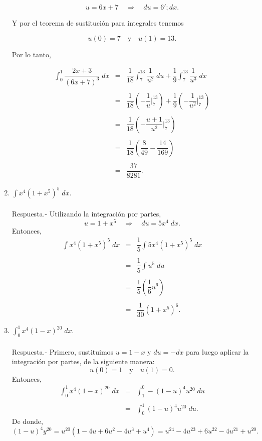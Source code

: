 \begin{enumerate}[\bfseries 1.]
	$$u=6x+7\quad \Rightarrow \quad du=6'; dx.$$

	Y por el teorema de sustitución para integrales tenemos

	$$u(0)=7\quad \mbox{y} \quad u(1)=13.$$

	Por lo tanto,

	$$
	\begin{array}{rcl}
	    \displaystyle\int_0^1 \dfrac{2x+3}{(6x+7)^3}\; dx &=& \dfrac{1}{18}\displaystyle\int_7^{13} \dfrac{1}{u^2}\; du  + \dfrac{1}{9}\int_7^{13} \dfrac{1}{u^3}\; dx\\\\
							      &=& \dfrac{1}{18}\left(-\dfrac{1}{u}\bigg|_7^{13}\right) + \dfrac{1}{9}\left(-\dfrac{1}{u^2}\bigg|_7^{13}\right)\\\\
							      &=& \dfrac{1}{18}\left(-\dfrac{u+1}{u^2}\bigg|_7^{13}\right)\\\\
							      &=& \dfrac{1}{18}\left(\dfrac{8}{49}-\dfrac{14}{169}\right)\\\\
							      &=& \dfrac{37}{8281}.
	\end{array}
	$$
	\vspace{.5cm}
	

    \item $\displaystyle\int x^4\left(1+x^5\right)^5\; dx.$\\\\
	Respuesta.-\; Utilizando la integración por partes,
	$$u=1+x^5\quad \Rightarrow \quad du=5x^4\; dx.$$
	Entonces,
	$$
	\begin{array}{rcl}
	    \displaystyle\int x^4\left(1+x^5\right)^5\; dx &=& \dfrac{1}{5} \displaystyle\int 5 x^4\left(1+x^5\right)^5\; dx\\\\
							   &=& \dfrac{1}{5}\displaystyle\int u^5\; du\\\\
							   &=& \dfrac{1}{5}\left(\dfrac{1}{6}u^6\right)\\\\
							   &=& \dfrac{1}{30}(1+x^5)^6.

	\end{array}
	$$
	\vspace{.5cm}

    \item $\displaystyle\int_0^1 x^4(1-x)^{20}\; dx.$\\\\
	Respuesta.-\; Primero, sustituimos $u=1-x$ y $du=-dx$ para luego aplicar la integración por partes, de la siguiente manera:
	$$u(0)=1\quad \mbox{y}\quad u(1)=0.$$
	Entonces,
	$$
	\begin{array}{rcl}
	    \displaystyle\int_0^1 x^4(1-x)^{20}\; dx &=& \displaystyle\int_1^0 -(1-u)^4u^{20}\; du\\\\
						     &=& \displaystyle\int_0^1 (1-u)^{4}u^{20}\; du.
	\end{array}
	$$
	De donde,
	$$(1-u)^4y^{20}=u^{20}\left(1-4u+6u^2-4u^3+u^4\right)=u^{24}-4u^{23}+6u^{22}-4u^{21}+u^{20}.$$


\end{enumerate}
